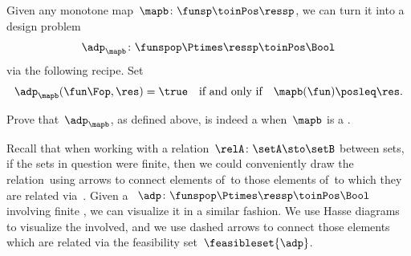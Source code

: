 \begin{gradedexercise}
    \label{ex:DPsFromMonotoneMaps}

    Given any monotone map~$\mapb\colon \funsp \toinPos \ressp$, we can turn it into a design problem
    \begin{equation*}
        \adp_\mapb \colon \funspop \Ptimes \ressp \toinPos \Bool
    \end{equation*}
    via the following recipe.
    Set
    \begin{equation*}
        \adp_\mapb (\fun\Fop, \res) = \true \quad \text{if and only if} \quad \mapb(\fun) \posleq \res.
    \end{equation*}

    Prove that~$\adp_\mapb$, as defined above, is indeed a  when~$\mapb$ is a .
\end{gradedexercise}


Recall that when working with a relation~$\relA \colon \setA \sto \setB$ between sets, if the sets in question were finite, then we could conveniently draw the relation~\relA using arrows to connect elements of~\setA to those elements of~\setB to which they are related via~\relA.
Given a ~$\adp \colon \funspop \Ptimes \ressp\toinPos \Bool$ involving finite , we can visualize it in a similar fashion.
We use Hasse diagrams to visualize the  involved, and we use dashed arrows to connect those elements which are related via the feasibility set~$\feasibleset{\adp}$.

\begin{marginfigure}
    \centering
    \caption{}
    \label{fig:example_dp_graph_xy}
\end{marginfigure}
\begin{marginfigure}
    \centering
    \caption{}
    \label{fig:example_dp_graph_xy_feas}
\end{marginfigure}

